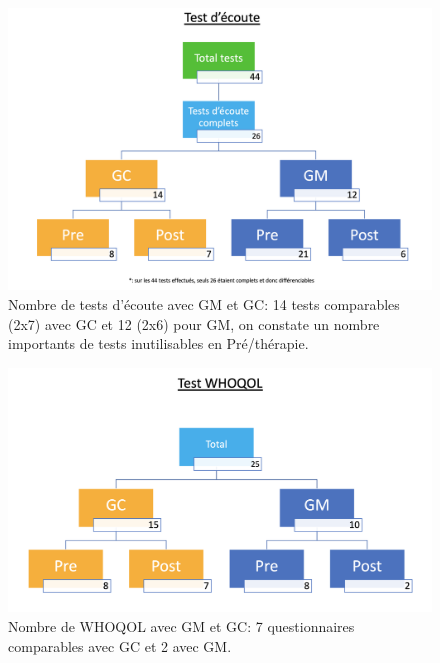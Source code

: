 \begin{figure}
	\centering
	\includegraphics[width=1\linewidth]{images/graphiques/Testecoute.png}
	\caption{Nombre de tests d'écoute avec GM et GC: 14 tests comparables (2x7) avec GC et 12 (2x6) 
	pour GM, on 
	constate 
	un nombre importants de tests  inutilisables en Pré/thérapie.}
	
\end{figure}



\begin{figure}
	\centering
	\includegraphics[width=1\linewidth]{images/graphiques/TestWQ.png}
	\caption{Nombre de WHOQOL avec GM et GC: 7 questionnaires comparables avec GC et 2 
	avec GM.}
\end{figure}






